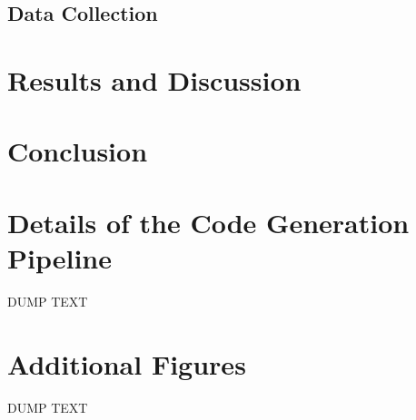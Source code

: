 \documentclass[conference]{IEEEtran}
\begin{document}
\subsection{Data Collection}



\section{Results and Discussion}
\section{Conclusion}

\appendices
\section{Details of the Code Generation Pipeline}
DUMP TEXT

\section{Additional Figures}
DUMP TEXT



\vspace{12pt}
\end{document}
